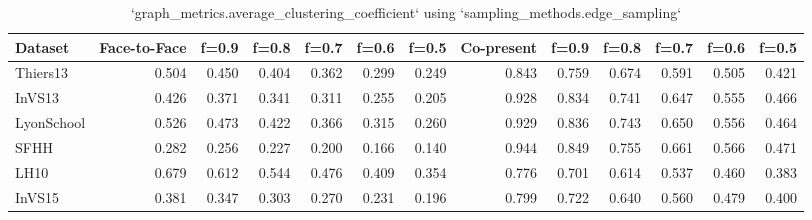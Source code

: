 \begin{table}[ht]
\begin{tabular}{lrrrrrrrrrrrr}
\hline
 Dataset    &   Face-to-Face &   f=0.9 &   f=0.8 &   f=0.7 &   f=0.6 &   f=0.5 &   Co-present &   f=0.9 &   f=0.8 &   f=0.7 &   f=0.6 &   f=0.5 \\
\hline
 Thiers13   &          0.504 &   0.450 &   0.404 &   0.362 &   0.299 &   0.249 &        0.843 &   0.759 &   0.674 &   0.591 &   0.505 &   0.421 \\
 InVS13     &          0.426 &   0.371 &   0.341 &   0.311 &   0.255 &   0.205 &        0.928 &   0.834 &   0.741 &   0.647 &   0.555 &   0.466 \\
 LyonSchool &          0.526 &   0.473 &   0.422 &   0.366 &   0.315 &   0.260 &        0.929 &   0.836 &   0.743 &   0.650 &   0.556 &   0.464 \\
 SFHH       &          0.282 &   0.256 &   0.227 &   0.200 &   0.166 &   0.140 &        0.944 &   0.849 &   0.755 &   0.661 &   0.566 &   0.471 \\
 LH10       &          0.679 &   0.612 &   0.544 &   0.476 &   0.409 &   0.354 &        0.776 &   0.701 &   0.614 &   0.537 &   0.460 &   0.383 \\
 InVS15     &          0.381 &   0.347 &   0.303 &   0.270 &   0.231 &   0.196 &        0.799 &   0.722 &   0.640 &   0.560 &   0.479 &   0.400 \\
\hline
\end{tabular}
\caption{`graph_metrics.average_clustering_coefficient` using `sampling_methods.edge_sampling`}
\end{table}